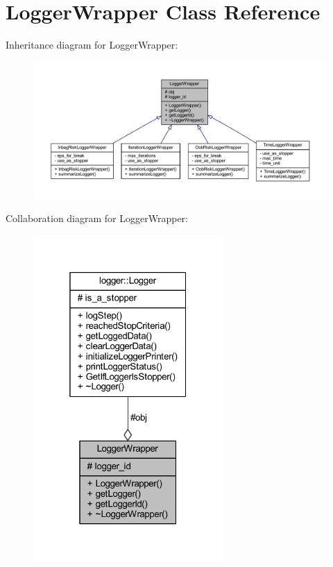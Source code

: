 \hypertarget{class_logger_wrapper}{}\section{Logger\+Wrapper Class Reference}
\label{class_logger_wrapper}


Inheritance diagram for Logger\+Wrapper\+:\nopagebreak
\begin{figure}[H]
\begin{center}
\leavevmode
\includegraphics[width=350pt]{class_logger_wrapper__inherit__graph}
\end{center}
\end{figure}


Collaboration diagram for Logger\+Wrapper\+:\nopagebreak
\begin{figure}[H]
\begin{center}
\leavevmode
\includegraphics[width=205pt]{class_logger_wrapper__coll__graph}
\end{center}
\end{figure}
